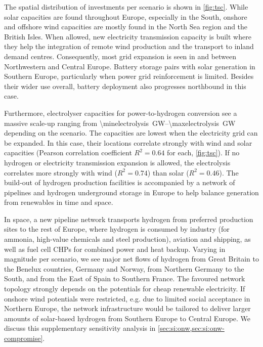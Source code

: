 The spatial distribution of investments per scenario is shown in \cref{fig:tsc}.
While solar capacities are found throughout Europe, especially in the South,
onshore and offshore wind capacities are mostly found in the North Sea region
and the British Isles. When allowed, new electricity transmission capacity is
built where they help the integration of remote wind production and the
transport to inland demand centres. Consequently, most grid expansion is seen in
and between Northwestern and Central Europe. Battery storage pairs with solar
generation in Southern Europe, particularly when power grid reinforcement is
limited. Besides their wider use overall, battery deployment also progresses
northbound in this case.

Furthermore, electrolyser capacities for power-to-hydrogen conversion see a
massive scale-up ranging from
\SIrange{\minelectrolysis}{\maxelectrolysis}{\giga\watt} depending on the
scenario. The capacities are lowest when the electricity grid can be expanded.
In this case, their locations correlate strongly with wind and solar capacities
(Pearson correlation coefficient $R^2=0.64$ for each, \cref{fig:tsc}). If no
hydrogen or electricity transmission expansion is allowed, the electrolysis
correlates more strongly with wind ($R^2=0.74$) than solar ($R^2=0.46$). The
build-out of hydrogen production facilities is accompanied by a network of
pipelines and hydrogen underground storage in Europe to help balance generation
from renewables in time and space.

In space, a new pipeline network transports hydrogen from preferred production
sites to the rest of Europe, where hydrogen is consumed by industry (for
ammonia, high-value chemicals and steel production), aviation and shipping, as
well as fuel cell CHPs for combined power and heat backup. Varying in magnitude
per scenario, we see major net flows of hydrogen from Great Britain to the
Benelux countries, Germany and Norway, from Northern Germany to the South, and
from the East of Spain to Southern France. The favoured network topology
strongly depends on the potentials for cheap renewable electricity. If onshore
wind potentials were restricted, e.g. due to limited social acceptance in
Northern Europe, the network infrastructure would be tailored to deliver larger
amounts of solar-based hydrogen from Southern Europe to Central Europe. We
discuss this supplementary sensitivity analysis in
\cref{sec:si:onw,sec:si:onw-compromise}.

